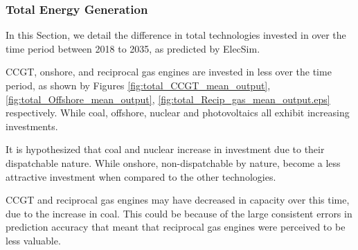\documentclass[final,3p,times,twocolumn,numbers]{elsarticle}
\begin{document}
\subsubsection{Total Energy Generation}



In this Section, we detail the difference in total technologies invested in over the time period between 2018 to 2035, as predicted by ElecSim.

CCGT, onshore, and reciprocal gas engines are invested in less over the time period, as shown by Figures \ref{fig:total_CCGT_mean_output}, \ref{fig:total_Offshore_mean_output}, \ref{fig:total_Recip_gas_mean_output.eps} respectively. While coal, offshore, nuclear and photovoltaics all exhibit increasing investments.

It is hypothesized that coal and nuclear increase in investment due to their dispatchable nature. While onshore, non-dispatchable by nature, become a less attractive investment when compared to the other technologies.

CCGT and reciprocal gas engines may have decreased in capacity over this time, due to the increase in coal. This could be because of the large consistent errors in prediction accuracy that meant that reciprocal gas engines were perceived to be less valuable.
\end{document}
